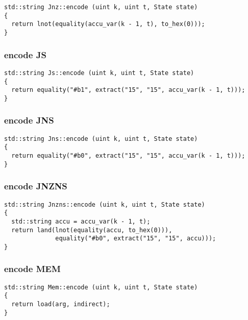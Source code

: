 \begin{lstlisting}[style=c++]
std::string Jnz::encode (uint k, uint t, State state)
{
  return lnot(equality(accu_var(k - 1, t), to_hex(0)));
}
\end{lstlisting}

\subsubsection{encode JS}

\begin{lstlisting}[style=c++]
std::string Js::encode (uint k, uint t, State state)
{
  return equality("#b1", extract("15", "15", accu_var(k - 1, t)));
}
\end{lstlisting}

\subsubsection{encode JNS}

\begin{lstlisting}[style=c++]
std::string Jns::encode (uint k, uint t, State state)
{
  return equality("#b0", extract("15", "15", accu_var(k - 1, t)));
}
\end{lstlisting}

\subsubsection{encode JNZNS}

\begin{lstlisting}[style=c++]
std::string Jnzns::encode (uint k, uint t, State state)
{
  std::string accu = accu_var(k - 1, t);
  return land(lnot(equality(accu, to_hex(0))),
              equality("#b0", extract("15", "15", accu)));
}
\end{lstlisting}

\subsubsection{encode MEM}

\begin{lstlisting}[style=c++]
std::string Mem::encode (uint k, uint t, State state)
{
  return load(arg, indirect);
}
\end{lstlisting}

